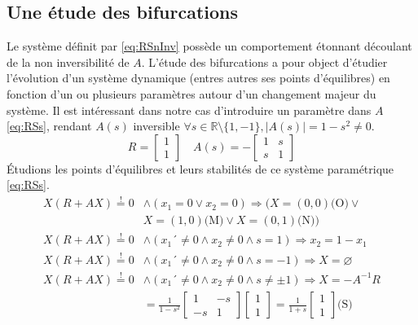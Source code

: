 \documentclass{wsdcr}
\begin{document}
\subsection{Une étude des bifurcations}
Le système définit par \ref{eq:RSnInv} possède un comportement étonnant découlant de la non inversibilité de $A$. L'étude des bifurcations a pour object d'étudier l'évolution d'un système dynamique (entres autres ses points d'équilibres) en fonction d'un ou plusieurs paramètres autour d'un changement majeur du système. Il est intéressant dans notre cas d'introduire un paramètre dans $A$ \ref{eq:RSs}, rendant $A(s)$ inversible $\forall s \in \mathds{R}\setminus \{1,-1\}, |A(s)|=1-s^2 \neq 0 $.
\begin{equation}
R={\begin{bmatrix}1\\1\end{bmatrix}}\quad A(s) =-{\begin{bmatrix}1&s\\s&1\end{bmatrix}}
\label{eq:RSs}
\end{equation}
Étudions les points d'équilibres et leurs stabilités de ce système paramétrique \ref{eq:RSs}. 
\begin{equation}
\begin{aligned}
X(R+AX)\overset{!}{=}0 &\land (x_1 = 0 \lor x_2 = 0) \Rightarrow (X=(0,0) \text{(O)} \lor \\ &X=(1,0) \text{(M)}\lor X=(0,1) \text{(N)})\\
X(R+AX)\overset{!}{=}0 &\land (x_1 ´\neq 0 \land x_2 \neq 0 \land s=1) \Rightarrow x_2=1-x_1 \\
X(R+AX)\overset{!}{=}0 &\land (x_1 ´\neq 0 \land x_2 \neq 0 \land s=-1) \Rightarrow X=\varnothing \\
X(R+AX)\overset{!}{=}0 &\land (x_1 ´\neq 0 \land x_2 \neq 0 \land s \neq \pm 1) \Rightarrow X=-A^{-1}R \\ &=\frac{1}{1-s^2}\begin{bmatrix}1&-s\\-s&1\end{bmatrix}\begin{bmatrix}1\\1\end{bmatrix}=\frac{1}{1+s}\begin{bmatrix}1\\1\end{bmatrix} \text{(S)}
\end{aligned}
\end{equation}
\end{document}
